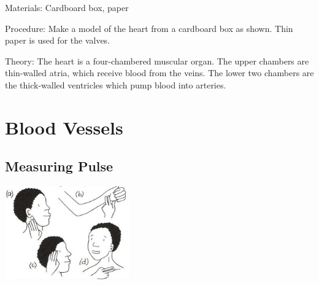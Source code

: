 \begin{multicols}{2}
\begin{description*}
\item[Materials:]{Cardboard box, paper}
\item[Procedure:]{Make a model of the heart from a
cardboard box as shown. Thin
paper is used for the valves.}
\item[Theory:]{The heart is a four-chambered muscular organ. The upper chambers are thin-walled atria,
which receive blood from the veins. The lower two chambers are the thick-walled ventricles
which pump blood into arteries.}
\end{description*}


\section*{Blood Vessels} 


\subsection{Measuring Pulse} %

\begin{center}
\includegraphics[width=0.4\textwidth]{./img/vso/measuring-pulse.jpg}
\end{center}


\end{multicols}

